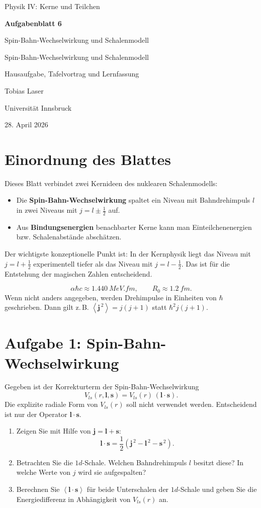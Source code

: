 \documentclass[11pt,a4paper]{scrartcl}
\newcommand{\CourseTitle}{COURSE NAME}
\newcommand{\DocumentKind}{DOCUMENT KIND}
\newcommand{\DocumentTitle}{DOCUMENT TITLE}
\newcommand{\DocumentSubtitle}{}
\newcommand{\AuthorName}{YOUR NAME}
\newcommand{\InstitutionName}{INSTITUTION NAME}
\newcommand{\SubmissionDate}{\today}
\newcommand{\makeuniversitytitle}{%
    \begin{titlepage}
        \centering
        \vspace*{2cm}
        {\Large \CourseTitle\par}
        \vspace{1.2cm}
        {\huge\bfseries \DocumentTitle\par}
        \ifx\DocumentSubtitle\empty\else
            \vspace{0.4cm}
            {\Large \DocumentSubtitle\par}
        \fi
        \vspace{1cm}
        {\Large \DocumentKind\par}
        \vfill
        {\large \AuthorName\par}
        \vspace{0.2cm}
        {\large \InstitutionName\par}
        \vspace{0.8cm}
        {\large \SubmissionDate\par}
    \end{titlepage}
    \pagenumbering{arabic}
}
\renewcommand{\CourseTitle}{Physik IV: Kerne und Teilchen}
\renewcommand{\DocumentKind}{Hausaufgabe, Tafelvortrag und Lernfassung}
\renewcommand{\DocumentTitle}{Aufgabenblatt 6}
\renewcommand{\DocumentSubtitle}{Spin-Bahn-Wechselwirkung und Schalenmodell}
\renewcommand{\AuthorName}{Tobias Laser}
\renewcommand{\InstitutionName}{Universit\"at Innsbruck}
\renewcommand{\SubmissionDate}{28. April 2026}
\newcommand{\avg}[1]{\left\langle #1 \right\rangle}
\newcommand{\paren}[1]{\left( #1 \right)}
\newcommand{\vect}[1]{\bm{#1}}
\newcommand{\half}{\frac{1}{2}}
\theoremstyle{definition}
\theoremstyle{plain}
\theoremstyle{remark}
\begin{document}
\makeuniversitytitle
\tableofcontents
\newpage

\section*{Einordnung des Blattes}

\begin{summarybox}[title=Ziel dieses Blattes]
Dieses Blatt verbindet zwei Kernideen des nuklearen Schalenmodells:
\begin{itemize}
    \item Die \textbf{Spin-Bahn-Wechselwirkung} spaltet ein Niveau mit Bahndrehimpuls $l$ in zwei Niveaus mit $j=l\pm \half$ auf.
    \item Aus \textbf{Bindungsenergien} benachbarter Kerne kann man Einteilchenenergien bzw. Schalenabst\"ande absch\"atzen.
\end{itemize}
Der wichtigste konzeptionelle Punkt ist: In der Kernphysik liegt das Niveau mit $j=l+\half$ experimentell tiefer als das Niveau mit $j=l-\half$. Das ist f\"ur die Entstehung der magischen Zahlen entscheidend.
\end{summarybox}

\begin{notebox}[title=Benutzte Konstanten und Konventionen]
\[
    \alpha \hbar c \approx \SI{1.440}{MeV.fm},
    \qquad
    R_0 \approx \SI{1.2}{fm}.
\]
Wenn nicht anders angegeben, werden Drehimpulse in Einheiten von $\hbar$ geschrieben. Dann gilt z.\,B. $\avg{\vect{j}^{\,2}}=j(j+1)$ statt $\hbar^2 j(j+1)$.
\end{notebox}

\FloatBarrier
\newpage

\section{Aufgabe 1: Spin-Bahn-Wechselwirkung}

\begin{taskbox}
Gegeben ist der Korrekturterm der Spin-Bahn-Wechselwirkung
\[
    V_{ls}(r,\vect{l},\vect{s}) = V_{ls}(r)\,\paren{\vect{l}\cdot\vect{s}}.
\]
Die explizite radiale Form von $V_{ls}(r)$ soll nicht verwendet werden. Entscheidend ist nur der Operator $\vect{l}\cdot\vect{s}$.
\begin{enumerate}[label=(\alph*)]
    \item Zeigen Sie mit Hilfe von $\vect{j}=\vect{l}+\vect{s}$:
    \[
        \vect{l}\cdot\vect{s}
        = \half \paren{\vect{j}^{\,2}-\vect{l}^{\,2}-\vect{s}^{\,2}}.
    \]
    \item Betrachten Sie die $1d$-Schale. Welchen Bahndrehimpuls $l$ besitzt diese? In welche Werte von $j$ wird sie aufgespalten?
    \item Berechnen Sie $\avg{\vect{l}\cdot\vect{s}}$ f\"ur beide Unterschalen der $1d$-Schale und geben Sie die Energiedifferenz in Abh\"angigkeit von $V_{ls}(r)$ an.
\end{enumerate}
\end{taskbox}
\end{document}
